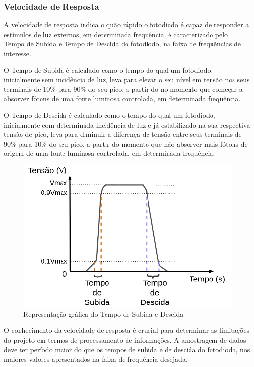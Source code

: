 \subsubsection{Velocidade de Resposta}
A velocidade de resposta indica o quão rápido o fotodiodo \'e capaz de responder a estímulos de luz externos, em determinada frequência. \'e caracterizado pelo Tempo de Subida e Tempo de Descida do fotodiodo, na faixa de frequências de interesse.

O Tempo de Subida \'e calculado como o tempo do qual um fotodiodo, inicialmente sem incidência de luz, leva para elevar o seu nível em tensão nos seus terminais de 10\% para 90\% do seu pico, a partir do no momento que começar a absorver fótons de uma fonte luminosa controlada, em determinada frequência.

O Tempo de Descida \'e calculado como o tempo do qual um fotodiodo, inicialmente com determinada incidência de luz e já estabilizado na sua respectiva tensão de pico, leva para diminuir a diferença de tensão entre seus terminais de 90\% para 10\% do seu pico, a partir do momento que não absorver mais fótons de origem de uma fonte luminosa controlada, em determinada frequência.

\begin{figure}[htb]
	\caption{\label{fig_velocidadeResp}Representação gr\'afica do Tempo de Subida e Descida}
	\begin{center}
	    \includegraphics[scale=0.3]{Imagens/GraficoVelocidadeResposta.png}
	\end{center}
\end{figure}

O conhecimento da velocidade de resposta \'e crucial para determinar as limitações do projeto em termos de processamento de informações. A amostragem de dados deve ter período maior do que os tempos de subida e de descida do fotodiodo, nos maiores valores apresentados na faixa de frequência desejada.

